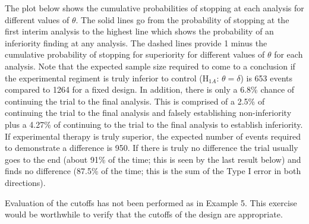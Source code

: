 The plot below shows the cumulative probabilities of stopping at each analysis
for different values of $\theta$. The solid lines go from the probability of
stopping at the first interim analysis to the highest line which shows the
probability of an inferiority finding at any analysis. The dashed lines
provide 1 minus the cumulative probability of stopping for superiority for
different values of $\theta$ for each analysis. Note that the expected sample
size required to come to a conclusion if the experimental regiment is truly
inferior to control (H$_{1A}$: $\theta = \delta$) is 653 events compared to 1264
for a fixed design. In addition, there is only a 6.8\% chance of continuing
the trial to the final analysis. This is comprised of a 2.5\% of continuing
the trial to the final analysis and falsely establishing non-inferiority plus a
4.27\% of continuing to the trial to the final analysis to establish
inferiority. If experimental therapy is truly superior, the expected number of
events required to demonstrate a difference is 950. If there is truly no
difference the trial usually goes to the end (about 91\% of the time; this is
seen by the last result below) and finds no difference (87.5\% of the time;
this is the sum of the Type I error in both directions).

Evaluation of the cutoffs has not been performed as in Example 5. This
exercise would be worthwhile to verify that the cutoffs of the design are appropriate.

